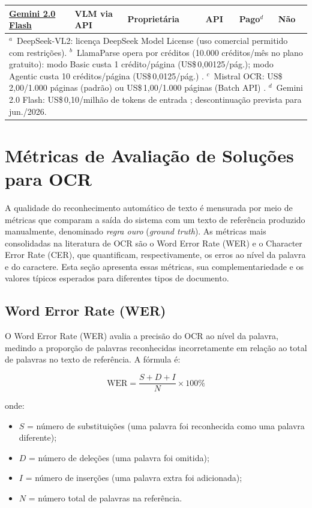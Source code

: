 \documentclass[
  12pt,
  oneside,
  a4paper,
  chapter=TITLE,
  section=TITLE,
  english,
  brazil
]{abntex2}
\begin{document}
\begin{table}[H]
\begin{tabular}{p{2.3cm} p{2.8cm} p{2cm} p{1.2cm} p{1.8cm} p{2cm}}
\href{https://ai.google.dev/gemini-api/docs/models}{Gemini 2.0 Flash}
  & VLM via API          & Proprietária & API   & Pago$^{d}$ & Não \\
\hline
\multicolumn{6}{p{14.5cm}}{%
  \footnotesize
  $^{a}$~DeepSeek-VL2: licença DeepSeek Model License (uso comercial permitido com
  restrições).
  $^{b}$~LlamaParse opera por créditos (10.000 créditos/mês no plano gratuito):
  modo Basic custa 1 crédito/página (US\$\,0,00125/pág.); modo Agentic custa
  10 créditos/página (US\$\,0,0125/pág.) \cite{llamaparse_pricing}.
  $^{c}$~Mistral OCR: US\$\,2,00/1.000 páginas (padrão) ou US\$\,1,00/1.000 páginas
  (Batch API) \cite{mistral2025}.
  $^{d}$~Gemini 2.0 Flash: US\$\,0,10/milhão de tokens de entrada
  \cite{gemini_pricing}; descontinuação prevista para jun./2026.
} \\
\end{tabular}
\end{table}

\section{Métricas de Avaliação de Soluções para OCR}

A qualidade do reconhecimento automático de texto é mensurada por meio de métricas que
comparam a saída do sistema com um texto de referência produzido manualmente, denominado
\textit{regra ouro} (\textit{ground truth}). As métricas mais consolidadas na literatura
de OCR são o Word Error Rate (WER) e o Character Error Rate (CER), que quantificam,
respectivamente, os erros ao nível da palavra e do caractere. Esta seção apresenta essas
métricas, sua complementariedade e os valores típicos esperados para diferentes tipos de
documento.

\subsection{Word Error Rate (WER)}

O Word Error Rate (WER) avalia a precisão do OCR ao nível da palavra, medindo a
proporção de palavras reconhecidas incorretamente em relação ao total de palavras no
texto de referência. A fórmula é:

\[
\text{WER} = \frac{S + D + I}{N} \times 100\%
\]

onde:
\begin{itemize}
    \item $S$ = número de substituições (uma palavra foi reconhecida como uma palavra
    diferente);
    \item $D$ = número de deleções (uma palavra foi omitida);
    \item $I$ = número de inserções (uma palavra extra foi adicionada);
    \item $N$ = número total de palavras na referência.
\end{itemize}
\end{document}

